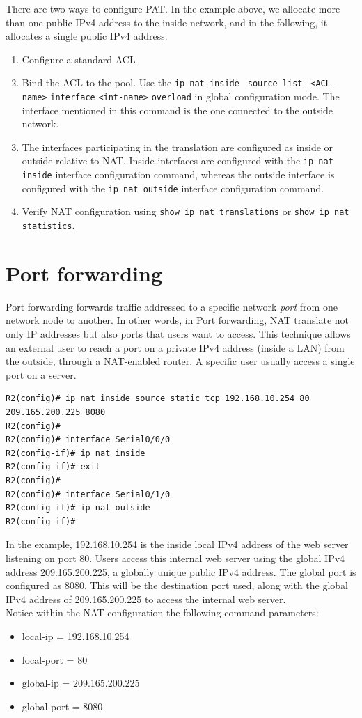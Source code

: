 There are two ways to configure PAT. In the example above, we allocate more than one public IPv4 address to the inside network, and in the following, it allocates a single public IPv4 address.

\begin{enumerate}
\item Configure a standard ACL

\item Bind the ACL to the pool. Use the \verb|ip nat inside | \verb|source list | \verb|<ACL-name>| \verb|interface| \verb|<int-name>| \verb|overload| in global configuration mode. The interface mentioned in this command is the one connected to the outside network.

\item The interfaces participating in the translation are configured as inside or outside relative to NAT. Inside interfaces are configured with the \verb|ip nat inside| interface configuration command, whereas the outside interface is configured with the \verb|ip nat outside| interface configuration command.

\item Verify NAT configuration using \verb|show ip nat translations| or \verb|show ip nat statistics|. 
\end{enumerate}

\section{Port forwarding}

Port forwarding forwards traffic addressed to a specific network \emph{port} from one network node to another. In other words, in Port forwarding, NAT translate not only IP addresses but also ports that users want to access. This technique allows an external user to reach a port on a private IPv4 address (inside a LAN) from the outside, through a NAT-enabled router. A specific user usually access a single port on a server. \\

\begin{verbatim}
R2(config)# ip nat inside source static tcp 192.168.10.254 80 209.165.200.225 8080
R2(config)#
R2(config)# interface Serial0/0/0
R2(config-if)# ip nat inside
R2(config-if)# exit
R2(config)#
R2(config)# interface Serial0/1/0
R2(config-if)# ip nat outside
R2(config-if)#
\end{verbatim}

In the example, 192.168.10.254 is the inside local IPv4 address of the web server listening on port 80. Users access this internal web server using the global IPv4 address 209.165.200.225, a globally unique public IPv4 address. The global port is configured as 8080. This will be the destination port used, along with the global IPv4 address of 209.165.200.225 to access the internal web server.\\

Notice within the NAT configuration the following command parameters:

\begin{itemize}
\item local-ip = 192.168.10.254
\item local-port = 80
\item global-ip = 209.165.200.225
\item global-port = 8080
\end{itemize}